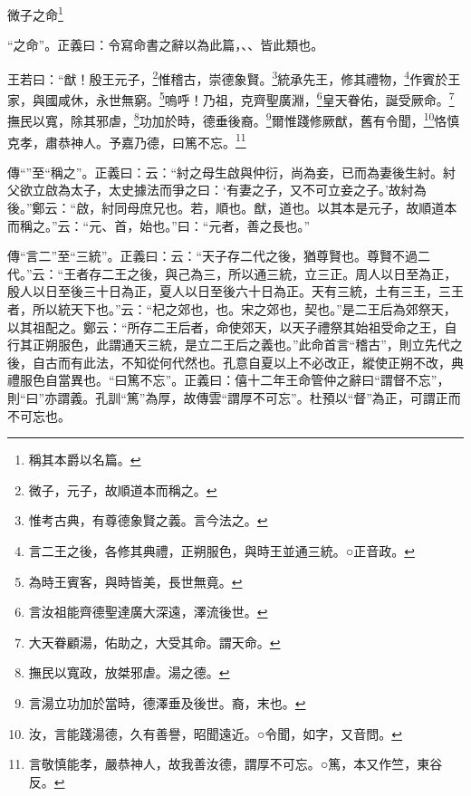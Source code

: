 微子之命\footnote{稱其本爵以名篇。}

{\noindent\shu{}\fzkt “之命”。正義曰：令寫命書之辭以為此篇，、、皆此類也。 \par}

王若曰：“猷！殷王元子，\footnote{微子，元子，故順道本而稱之。}惟稽古，崇德象賢。\footnote{惟考古典，有尊德象賢之義。言今法之。}統承先王，修其禮物，\footnote{言二王之後，各修其典禮，正朔服色，與時王並通三統。○正音政。}作賓於王家，與國咸休，永世無窮。\footnote{為時王賓客，與時皆美，長世無竟。}嗚呼！乃祖，克齊聖廣淵，\footnote{言汝祖能齊德聖達廣大深遠，澤流後世。}皇天眷佑，誕受厥命。\footnote{大天眷顧湯，佑助之，大受其命。謂天命。}撫民以寬，除其邪虐，\footnote{撫民以寬政，放桀邪虐。湯之德。}功加於時，德垂後裔。\footnote{言湯立功加於當時，德澤垂及後世。裔，末也。}爾惟踐修厥猷，舊有令聞，\footnote{汝，言能踐湯德，久有善譽，昭聞遠近。○令聞，如字，又音問。}恪慎克孝，肅恭神人。予嘉乃德，曰篤不忘。\footnote{言敬慎能孝，嚴恭神人，故我善汝德，謂厚不可忘。○篤，本又作竺，東谷反。}


{\noindent\zhuan{}\fzbyks 傳“”至“稱之”。正義曰：云：“紂之母生啟與仲衍，尚為妾，已而為妻後生紂。紂父欲立啟為太子，太史據法而爭之曰：‘有妻之子，又不可立妾之子。’故紂為後。”鄭云：“啟，紂同母庶兄也。若，順也。猷，道也。以其本是元子，故順道本而稱之。”云：“元、首，始也。”曰：“元者，善之長也。” \par}

{\noindent\zhuan{}\fzbyks 傳“言二”至“三統”。正義曰：云：“天子存二代之後，猶尊賢也。尊賢不過二代。”云：“王者存二王之後，與己為三，所以通三統，立三正。周人以日至為正，殷人以日至後三十日為正，夏人以日至後六十日為正。天有三統，土有三王，三王者，所以統天下也。”云：“杞之郊也，也。宋之郊也，契也。”是二王后為郊祭天，以其祖配之。鄭云：“所存二王后者，命使郊天，以天子禮祭其始祖受命之王，自行其正朔服色，此謂通天三統，是立二王后之義也。”此命首言“稽古”，則立先代之後，自古而有此法，不知從何代然也。孔意自夏以上不必改正，縱使正朔不改，典禮服色自當異也。“曰篤不忘”。正義曰：僖十二年王命管仲之辭曰“謂督不忘”，則“曰”亦謂義。孔訓“篤”為厚，故傳雲“謂厚不可忘”。杜預以“督”為正，可謂正而不可忘也。 \par}

